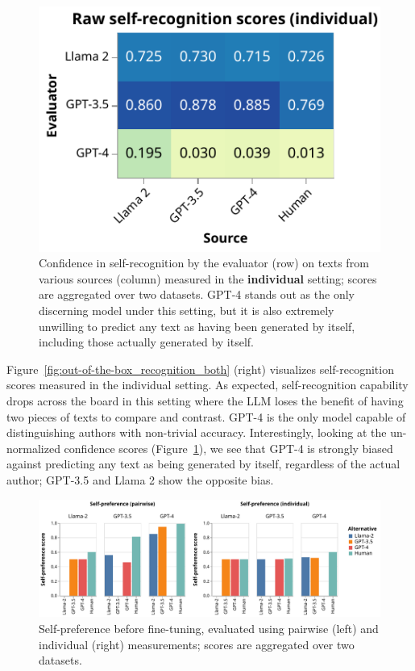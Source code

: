 \documentclass{article}
\theoremstyle{plain}
\theoremstyle{definition}
\theoremstyle{remark}
\begin{document}
\begin{figure}[h]
\centering
\includegraphics[width=0.75\columnwidth]{images/individual_recognition_scores.pdf}
\caption{Confidence in self-recognition by the evaluator (row) on texts from various sources (column) measured in the \textbf{individual} setting; scores are aggregated over two datasets. GPT-4 stands out as the only discerning model under this setting, but it is also extremely unwilling to predict any text as having been generated by itself, including those actually generated by itself.}
\label{fig:individual_recognition_scores}
\end{figure}



Figure~\ref{fig:out-of-the-box_recognition_both} (right) visualizes self-recognition scores measured in the individual setting.
As expected, self-recognition capability drops across the board in this setting where the LLM loses the benefit of having two pieces of texts to compare and contrast.
GPT-4 is the only model capable of distinguishing authors with non-trivial accuracy.
Interestingly, looking at the un-normalized confidence scores (Figure~\ref{fig:individual_recognition_scores}), we see that GPT-4 is strongly biased against predicting any text as being generated by itself, regardless of the actual author; GPT-3.5 and Llama 2 show the opposite bias.


\begin{figure}
    \centering
    \includegraphics[width=\textwidth]{images/preference_scores.pdf}
    \caption{Self-preference before fine-tuning, evaluated using pairwise (left) and individual (right) measurements; scores are aggregated over two datasets.}
\label{fig:out-of-the-box_preference_both}
\end{figure}
\end{document}
